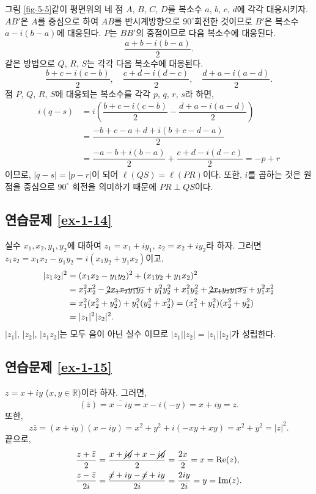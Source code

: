 그림 \ref{fig-5-5}\와 같이
평면위의 네 점 $A$, $B$, $C$, $D$를 복소수 $a$, $b$, $c$, $d$에 각각 대응시키자.
$AB'$은  $A$를 중심으로 하여 $AB$를 반시계방향으로 $90^\circ$회전한 것이므로
$B'$은 복소수 $a-i(b-a)$에 대응된다.
$P$는 $BB'$의 중점이므로 다음 복소수에 대응된다.
\[
\dfrac{a+b-i(b-a)}2.
\]
같은 방법으로 $Q$, $R$, $S$는 각각 다음 복소수에 대응된다.
\[
\dfrac{b+c-i(c-b)}2, \quad
\dfrac{c+d-i(d-c)}2, \quad
\dfrac{d+a-i(a-d)}2.
\]
점 $P$, $Q$, $R$, $S$에 대응되는 복소수를 각각
$p$, $q$, $r$, $s$라 하면,
\begin{align*}
i(q-s) &= i \left(
\dfrac{b+c-i(c-b)}2 - \dfrac{d+a-i(a-d)}2 \right) \\
&= \dfrac{-b+c-a+d+i(b+c-d-a)}2 \\
&= \dfrac{-a-b+i(b-a)}2 + \dfrac{c+d-i(d-c)}2 = -p+r
\end{align*}
이므로, $|q-s| = |p-r|$이 되어 $\ell(QS) = \ell(PR)$이다.
또한, $i$를 곱하는 것은 원점을 중심으로 $90^\circ$ 회전을 의미하기 때문에
$PR\perp QS$이다.

\subsection*{연습문제 \ref{ex-1-14}}

실수 $x_1, x_2, y_1, y_2$에 대하여
$z_1 = x_1 + iy_1$, $z_2 = x_2 + iy_2$라 하자.
그러면 $z_1z_2 = x_1x_2 - y_1y_2 = i(x_1y_2+y_1x_2)$이고,
\begin{align*}
|z_1z_2|^2 &=  (x_1x_2 - y_1y_2)^2 + (x_1y_2 + y_1x_2)^2 \\
&= x_1^2x_2^2 - \cancel{2x_1x_2y_1y_2} + y_1^2y_2^2
+ x_1^2y_2^2 + \cancel{2x_1y_2y_1x_2} + y_1^2x_2^2 \\
&=x_1^2(x_2^2+y_2^2) + y_1^2(y_2^2+x_2^2)
= (x_1^2+y_1^2)(x_2^2+y_2^2) \\
&= |z_1|^2|z_2|^2.
\end{align*}
$|z_1|$, $|z_2|$, $|z_1z_2|$는 모두 음이 아닌 실수 이므로
$|z_1||z_2| = |z_1||z_2|$가 성립한다.

\subsection*{연습문제 \ref{ex-1-15}}

$z=x+iy$ ($x,y\in\mathbb R$)이라 하자. 그러면,
\[
\overline{(\bar z)} = \overline{x-iy}
= x - i(-y) = x+iy = z.
\]
또한, 
\[
z\bar z = (x+iy)(x-iy) = x^2+y^2 + i(- xy + xy)
= x^2+y^2 = |z|^2.
\]
끝으로,
\begin{align*}
\dfrac{z + \bar z}2 &= \dfrac{x+\cancel{iy}+ x -\cancel{iy}}2
= \dfrac{2x}2 = x =\Re(z), \\
\dfrac{z - \bar z}{2i} &= \dfrac{\cancel{x}+iy - \cancel{x} +iy}{2i}
= \dfrac{2iy}{2i} = y = \Im(z).
\end{align*}

